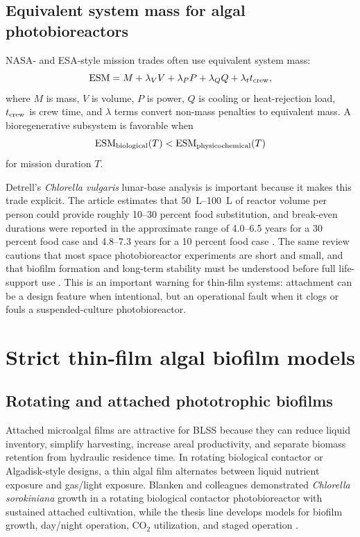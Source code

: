 \documentclass[11pt]{article}
\newcommand{\Chl}{\textit{Chlorella vulgaris}}
\newcommand{\Soro}{\textit{Chlorella sorokiniana}}
\newcommand{\ESM}{\ensuremath{\mathrm{ESM}}}
\begin{document}
\subsection{Equivalent system mass for algal photobioreactors}

NASA- and ESA-style mission trades often use equivalent system mass:
\begin{equation}
  \ESM=M+\lambda_VV+\lambda_PP+\lambda_QQ+\lambda_tt_{\rm crew},
  \label{eq:esm}
\end{equation}
where $M$ is mass, $V$ is volume, $P$ is power, $Q$ is cooling or heat-rejection load, $t_{\rm crew}$ is crew time, and $\lambda$ terms convert non-mass penalties to equivalent mass. A bioregenerative subsystem is favorable when
\begin{equation}
  \ESM_{\rm biological}(T)<\ESM_{\rm physicochemical}(T)
  \label{eq:esm_breakeven}
\end{equation}
for mission duration $T$.

Detrell's \Chl{} lunar-base analysis is important because it makes this trade explicit. The article estimates that \SIrange{50}{100}{L} of reactor volume per person could provide roughly 10--30 percent food substitution, and break-even durations were reported in the approximate range of 4.0--6.5 years for a 30 percent food case and 4.8--7.3 years for a 10 percent food case \parencite[3--5]{detrell2021}. The same review cautions that most space photobioreactor experiments are short and small, and that biofilm formation and long-term stability must be understood before full life-support use \parencite[7--8]{detrell2021}. This is an important warning for thin-film systems: attachment can be a design feature when intentional, but an operational fault when it clogs or fouls a suspended-culture photobioreactor.

\section{Strict thin-film algal biofilm models}

\subsection{Rotating and attached phototrophic biofilms}

Attached microalgal films are attractive for BLSS because they can reduce liquid inventory, simplify harvesting, increase areal productivity, and separate biomass retention from hydraulic residence time. In rotating biological contactor or Algadisk-style designs, a thin algal film alternates between liquid nutrient exposure and gas/light exposure. Blanken and colleagues demonstrated \Soro{} growth in a rotating biological contactor photobioreactor with sustained attached cultivation, while the thesis line develops models for biofilm growth, day/night operation, CO$_2$ utilization, and staged operation \parencite[2436--2445]{blanken2014}\parencite[abstract]{blanken2016}.
\end{document}
